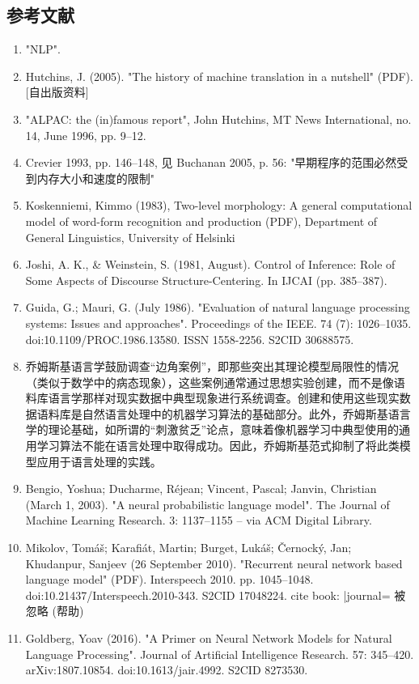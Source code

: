 \subsection{参考文献} 
\begin{enumerate}
\item "NLP".  
\item Hutchins, J. (2005). "The history of machine translation in a nutshell" (PDF). [自出版资料]  
\item "ALPAC: the (in)famous report", John Hutchins, MT News International, no. 14, June 1996, pp. 9–12.  
\item Crevier 1993, pp. 146–148, 见 Buchanan 2005, p. 56: "早期程序的范围必然受到内存大小和速度的限制"  
\item Koskenniemi, Kimmo (1983), Two-level morphology: A general computational model of word-form recognition and production (PDF), Department of General Linguistics, University of Helsinki  
\item Joshi, A. K., & Weinstein, S. (1981, August). Control of Inference: Role of Some Aspects of Discourse Structure-Centering. In IJCAI (pp. 385–387).  
\item Guida, G.; Mauri, G. (July 1986). "Evaluation of natural language processing systems: Issues and approaches". Proceedings of the IEEE. 74 (7): 1026–1035. doi:10.1109/PROC.1986.13580. ISSN 1558-2256. S2CID 30688575.  
\item 乔姆斯基语言学鼓励调查“边角案例”，即那些突出其理论模型局限性的情况（类似于数学中的病态现象），这些案例通常通过思想实验创建，而不是像语料库语言学那样对现实数据中典型现象进行系统调查。创建和使用这些现实数据语料库是自然语言处理中的机器学习算法的基础部分。此外，乔姆斯基语言学的理论基础，如所谓的“刺激贫乏”论点，意味着像机器学习中典型使用的通用学习算法不能在语言处理中取得成功。因此，乔姆斯基范式抑制了将此类模型应用于语言处理的实践。  
\item Bengio, Yoshua; Ducharme, Réjean; Vincent, Pascal; Janvin, Christian (March 1, 2003). "A neural probabilistic language model". The Journal of Machine Learning Research. 3: 1137–1155 – via ACM Digital Library.  
\item Mikolov, Tomáš; Karafiát, Martin; Burget, Lukáš; Černocký, Jan; Khudanpur, Sanjeev (26 September 2010). "Recurrent neural network based language model" (PDF). Interspeech 2010. pp. 1045–1048. doi:10.21437/Interspeech.2010-343. S2CID 17048224. {{cite book}}: |journal= 被忽略 (帮助)
\item Goldberg, Yoav (2016). "A Primer on Neural Network Models for Natural Language Processing". Journal of Artificial Intelligence Research. 57: 345–420. arXiv:1807.10854. doi:10.1613/jair.4992. S2CID 8273530.  

\end{enumerate}
